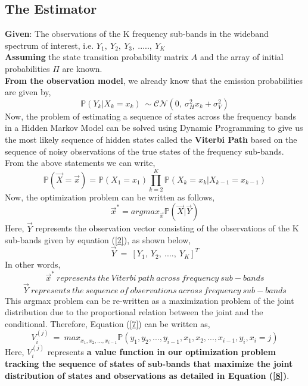 \documentclass[12pt, draftcls, onecolumn]{IEEEtran}
\begin{document}
\subsection{The Estimator}
\textbf{Given}: The observations of the K frequency sub-bands in the wideband spectrum of interest, i.e. $Y_1,\ Y_2,\ Y_3,\ .....,\ Y_K$
\\\textbf{Assuming} the state transition probability matrix $A$ and the array of initial probabilities $\Pi$ are known.
\\\textbf{From the observation model}, we already know that the emission probabilities are given by,
\[\mathbb P(Y_k|X_k = x_k)\ \sim \mathcal{CN}(0,\ \sigma_H^2x_k+\sigma_V^2)\]
Now, the problem of estimating a sequence of states across the frequency bands in a Hidden Markov Model can be solved using Dynamic Programming to give us the most likely sequence of hidden states called the \textbf{Viterbi Path} based on the sequence of noisy observations of the true states of the frequency sub-bands.
\\From the above statements we can write,
\begin{equation*}
    \mathbb P(\vec{X}=\vec{x}) = \mathbb P(X_1=x_1) \prod_{k=2}^{K} \mathbb P(X_k=x_k|X_{k-1}=x_{k-1})
\end{equation*}
Now, the optimization problem can be written as follows,
\begin{equation}\label{7}
    \vec{x}^* = argmax_{\vec{x}} \mathbb P(\vec{X}|\vec{Y})
\end{equation}
Here,
$\vec{Y}$ represents the observation vector consisting of the observations of the K sub-bands given by equation (\ref{2}), as shown below,
\[\vec{Y}\ =\ [{Y}_1,\ {Y}_2,\ ....,\ {Y}_K]^T\]
In other words,
\[\vec{x}^*\ represents\ the\ Viterbi\ path\ across\ frequency\ sub-bands\]
\[\vec{Y}\ represents\ the\ sequence\ of\ observations\ across\ frequency\ sub-bands\]
This argmax problem can be re-written as a maximization problem of the joint distribution due to the proportional relation between the joint and the conditional. Therefore, Equation (\ref{7}) can be written as,
\begin{equation}\label{8}
    V_{i}^{(j)}\ =\ max_{x_1,x_2,...,x_{i-1}}\mathbb P(y_1,y_2,...,y_{i-1},x_1,x_2,...,x_{i-1},y_i,x_{i}=j)
\end{equation}
Here, $V_{i}^{(j)}$ represents \textbf{a value function in our optimization problem tracking the sequence of states of sub-bands that maximize the joint distribution of states and observations as detailed in Equation (\ref{8})}.
\end{document}
